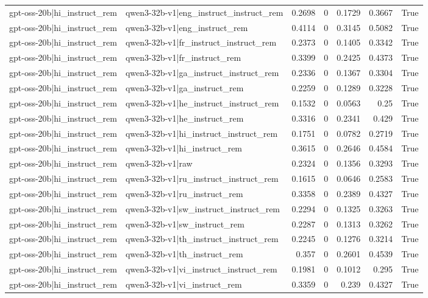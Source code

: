 \begin{table}
\begin{tabular}{l l r r r r l}
gpt-oss-20b|hi_instruct_rem & qwen3-32b-v1|eng_instruct_instruct_rem & 0.2698 & 0 & 0.1729 & 0.3667 & True \\
gpt-oss-20b|hi_instruct_rem & qwen3-32b-v1|eng_instruct_rem & 0.4114 & 0 & 0.3145 & 0.5082 & True \\
gpt-oss-20b|hi_instruct_rem & qwen3-32b-v1|fr_instruct_instruct_rem & 0.2373 & 0 & 0.1405 & 0.3342 & True \\
gpt-oss-20b|hi_instruct_rem & qwen3-32b-v1|fr_instruct_rem & 0.3399 & 0 & 0.2425 & 0.4373 & True \\
gpt-oss-20b|hi_instruct_rem & qwen3-32b-v1|ga_instruct_instruct_rem & 0.2336 & 0 & 0.1367 & 0.3304 & True \\
gpt-oss-20b|hi_instruct_rem & qwen3-32b-v1|ga_instruct_rem & 0.2259 & 0 & 0.1289 & 0.3228 & True \\
gpt-oss-20b|hi_instruct_rem & qwen3-32b-v1|he_instruct_instruct_rem & 0.1532 & 0 & 0.0563 & 0.25 & True \\
gpt-oss-20b|hi_instruct_rem & qwen3-32b-v1|he_instruct_rem & 0.3316 & 0 & 0.2341 & 0.429 & True \\
gpt-oss-20b|hi_instruct_rem & qwen3-32b-v1|hi_instruct_instruct_rem & 0.1751 & 0 & 0.0782 & 0.2719 & True \\
gpt-oss-20b|hi_instruct_rem & qwen3-32b-v1|hi_instruct_rem & 0.3615 & 0 & 0.2646 & 0.4584 & True \\
gpt-oss-20b|hi_instruct_rem & qwen3-32b-v1|raw & 0.2324 & 0 & 0.1356 & 0.3293 & True \\
gpt-oss-20b|hi_instruct_rem & qwen3-32b-v1|ru_instruct_instruct_rem & 0.1615 & 0 & 0.0646 & 0.2583 & True \\
gpt-oss-20b|hi_instruct_rem & qwen3-32b-v1|ru_instruct_rem & 0.3358 & 0 & 0.2389 & 0.4327 & True \\
gpt-oss-20b|hi_instruct_rem & qwen3-32b-v1|sw_instruct_instruct_rem & 0.2294 & 0 & 0.1325 & 0.3263 & True \\
gpt-oss-20b|hi_instruct_rem & qwen3-32b-v1|sw_instruct_rem & 0.2287 & 0 & 0.1313 & 0.3262 & True \\
gpt-oss-20b|hi_instruct_rem & qwen3-32b-v1|th_instruct_instruct_rem & 0.2245 & 0 & 0.1276 & 0.3214 & True \\
gpt-oss-20b|hi_instruct_rem & qwen3-32b-v1|th_instruct_rem & 0.357 & 0 & 0.2601 & 0.4539 & True \\
gpt-oss-20b|hi_instruct_rem & qwen3-32b-v1|vi_instruct_instruct_rem & 0.1981 & 0 & 0.1012 & 0.295 & True \\
gpt-oss-20b|hi_instruct_rem & qwen3-32b-v1|vi_instruct_rem & 0.3359 & 0 & 0.239 & 0.4327 & True \\

\end{tabular}
\end{table}
